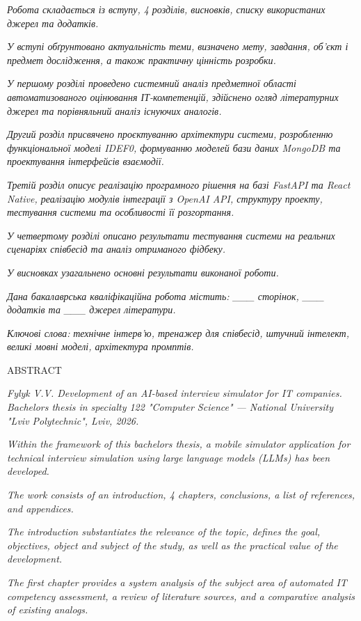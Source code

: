 \documentclass[
]{article}
\begin{document}
\emph{Робота складається із вступу, 4 розділів, висновків, списку
використаних джерел та додатків.}

\emph{У вступі обґрунтовано актуальність теми, визначено мету, завдання,
об'єкт і предмет дослідження, а також практичну цінність розробки.}

\emph{У першому розділі проведено системний аналіз предметної області
автоматизованого оцінювання ІТ-компетенцій, здійснено огляд літературних
джерел та порівняльний аналіз існуючих аналогів.}

\emph{Другий розділ присвячено проєктуванню архітектури системи,
розробленню функціональної моделі IDEF0, формуванню моделей бази даних
MongoDB та проектування інтерфейсів взаємодії.}

\emph{Третій розділ описує реалізацію програмного рішення на базі
FastAPI та React Native, реалізацію модулів інтеграції з OpenAI API,
структуру проекту, тестування системи та особливості її розгортання.}

\emph{У четвертому розділі описано результати тестування системи на
реальних сценаріях співбесід та аналіз отриманого фідбеку.}

\emph{У висновках узагальнено основні результати виконаної роботи.}

\emph{Дана бакалаврська кваліфікаційна робота містить: \_\_\_ сторінок,
\_\_\_ додатків та \_\_\_ джерел літератури.}

\emph{Ключові слова:} \emph{технічне інтерв'ю, тренажер для співбесід,
штучний інтелект, великі мовні моделі, архітектура промптів.}

ABSTRACT

\emph{Fylyk V.V. Development of an AI-based interview simulator for IT
companies. Bachelor\textquotesingle s thesis in specialty 122 "Computer
Science" --- National University "Lviv Polytechnic", Lviv, 2026.}

\emph{Within the framework of this bachelor\textquotesingle s thesis, a
mobile simulator application for technical interview simulation using
large language models (LLMs) has been developed.}

\emph{The work consists of an introduction, 4 chapters, conclusions, a
list of references, and appendices.}

\emph{The introduction substantiates the relevance of the topic, defines
the goal, objectives, object and subject of the study, as well as the
practical value of the development.}

\emph{The first chapter provides a system analysis of the subject area
of automated IT competency assessment, a review of literature sources,
and a comparative analysis of existing analogs.}
\end{document}
